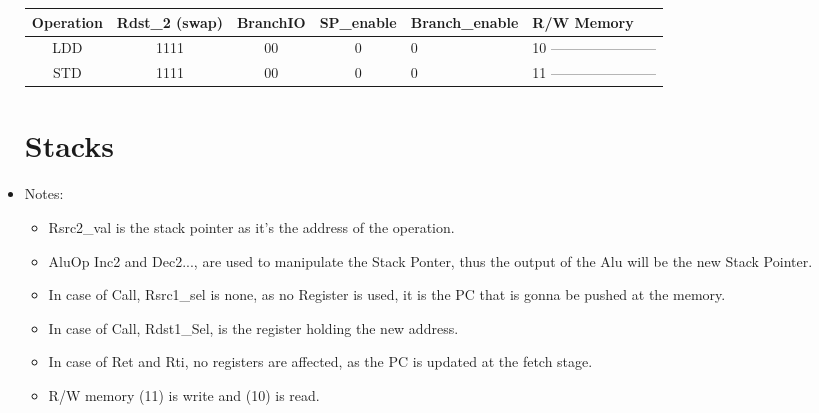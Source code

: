 \documentclass[12pt]{report}
\begin{document}
\begin{itemize}
\begin{center}
\begin{tabular}{||c| c| c| c| p{40mm}||}
        \end{tabular}
        \end{center}

        \begin{center}
        \begin{tabular}{||c| c| c| c| p{40mm}||} 
        \hline
        Operation & Rdst_2 (swap) & BranchIO & SP_enable & Branch_enable & R/W Memory  \\ [0.5ex] 
        \hline\hline
        LDD & 1111 & 00 & 0 & 0 & 10 ----------------------- \\
        \hline
        STD & 1111 & 00 & 0 & 0 & 11 ----------------------- \\
        \hline

        \end{tabular}
        \end{center}

        \section{Stacks}
        \item Notes:
        \begin{itemize}
            \item Rsrc2_val is the stack pointer as it's the address of the operation.
            \item AluOp Inc2 and Dec2..., are used to manipulate the Stack Ponter, thus the output of the Alu will be the new Stack Pointer.
            \item In case of Call, Rsrc1_sel is none, as no Register is used, it is the PC that is gonna be pushed at the memory.
            \item In case of Call, Rdst1_Sel, is the register holding the new address.
            \item In case of Ret and Rti, no registers are affected, as the PC is updated at the fetch stage.
            \item R/W memory (11) is write and (10) is read.
        \end{itemize}


\end{itemize}
\end{document}
